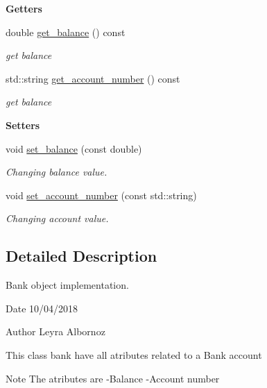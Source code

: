 \begin{Indent}{\bf Getters}\par
\begin{DoxyCompactItemize}
\item 
double \hyperlink{class_cbank__account_a3a04a3ddbbe032c369aa3cf483720f5c}{get\+\_\+balance} () const 
\begin{DoxyCompactList}\small\item\em get balance \end{DoxyCompactList}\item 
std\+::string \hyperlink{class_cbank__account_a666b0e292527ad2886f34a93789ab80d}{get\+\_\+account\+\_\+number} () const 
\begin{DoxyCompactList}\small\item\em get balance \end{DoxyCompactList}\end{DoxyCompactItemize}
\end{Indent}
\begin{Indent}{\bf Setters}\par
\begin{DoxyCompactItemize}
\item 
void \hyperlink{class_cbank__account_ab47bf4fce0d38963c39ce893553b951f}{set\+\_\+balance} (const double)
\begin{DoxyCompactList}\small\item\em Changing balance value. \end{DoxyCompactList}\item 
void \hyperlink{class_cbank__account_a920a324760772b2018fe4a4812a8eeca}{set\+\_\+account\+\_\+number} (const std\+::string)
\begin{DoxyCompactList}\small\item\em Changing account value. \end{DoxyCompactList}\end{DoxyCompactItemize}
\end{Indent}


\subsection{Detailed Description}
Bank object implementation. 

\begin{DoxyDate}{Date}
10/04/2018 
\end{DoxyDate}
\begin{DoxyAuthor}{Author}
Leyra Albornoz
\end{DoxyAuthor}
This class bank have all atributes related to a Bank account \begin{DoxyNote}{Note}
The atributes are -\/\+Balance -\/\+Account number 
\end{DoxyNote}


